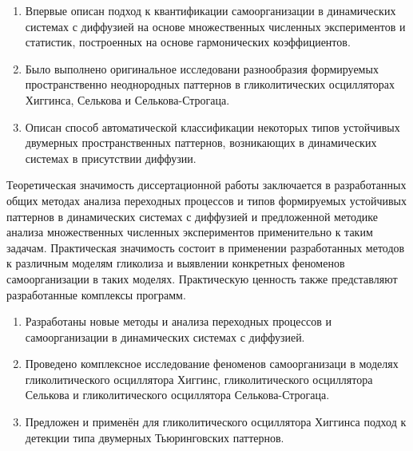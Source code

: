 {\novelty}
\begin{enumerate}[beginpenalty=10000] %
  \item Впервые описан подход к квантификации самоорганизации в динамических системах с диффузией на основе множественных численных экспериментов и статистик, построенных на основе гармонических коэффициентов.
  \item Было выполнено оригинальное исследовани разнообразия формируемых пространственно неоднородных паттернов в гликолитических осцилляторах Хиггинса, Селькова и Селькова-Строгаца. 
  \item Описан способ автоматической классификации некоторых типов устойчивых двумерных пространственных паттернов, возникающих в динамических системах в присутствии диффузии.
\end{enumerate}

{\influence} Теоретическая значимость диссертационной работы заключается в разработанных общих методах анализа переходных процессов и типов формируемых устойчивых паттернов в динамических системах с диффузией и предложенной методике анализа множественных численных экспериментов применительно к таким задачам. Практическая значимость состоит в применении разработанных методов к различным моделям гликолиза и выявлении конкретных феноменов самоорганизации в таких моделях. Практическую ценность также представляют разработанные комплексы программ.

{}
\begin{enumerate}[beginpenalty=10000] %
  \item Разработаны новые методы и анализа переходных процессов и самоорганизации в динамических системах с диффузией.
  \item Проведено комплексное исследование феноменов самоорганизаци в моделях гликолитического осциллятора Хиггинс, гликолитического осциллятора Селькова и гликолитического осциллятора Селькова-Строгаца.
  \item Предложен и применён для гликолитического осциллятора Хиггинса подход к детекции типа двумерных Тьюринговских паттернов.
\end{enumerate}

